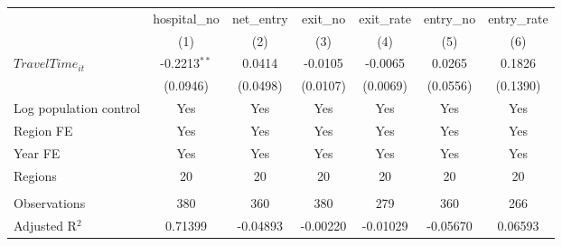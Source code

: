 \begingroup
\centering
\begin{tabular}{lcccccc}
   \toprule
                          & hospital\_no   & net\_entry  & exit\_no  & exit\_rate  & entry\_no  & entry\_rate \\    
                          & (1)            & (2)         & (3)       & (4)         & (5)        & (6)\\  
   \midrule 
   $TravelTime_{it}$      & -0.2213$^{**}$ & 0.0414      & -0.0105   & -0.0065     & 0.0265     & 0.1826\\   
                          & (0.0946)       & (0.0498)    & (0.0107)  & (0.0069)    & (0.0556)   & (0.1390)\\   
   Log population control & Yes            & Yes         & Yes       & Yes         & Yes        & Yes\\  
   Region FE              & Yes            & Yes         & Yes       & Yes         & Yes        & Yes\\  
   Year FE                & Yes            & Yes         & Yes       & Yes         & Yes        & Yes\\  
   Regions                & 20             & 20          & 20        & 20          & 20         & 20\\  
    \\
   Observations           & 380            & 360         & 380       & 279         & 360        & 266\\  
   Adjusted R$^2$         & 0.71399        & -0.04893    & -0.00220  & -0.01029    & -0.05670   & 0.06593\\  
   \bottomrule
\end{tabular}
\par\endgroup
